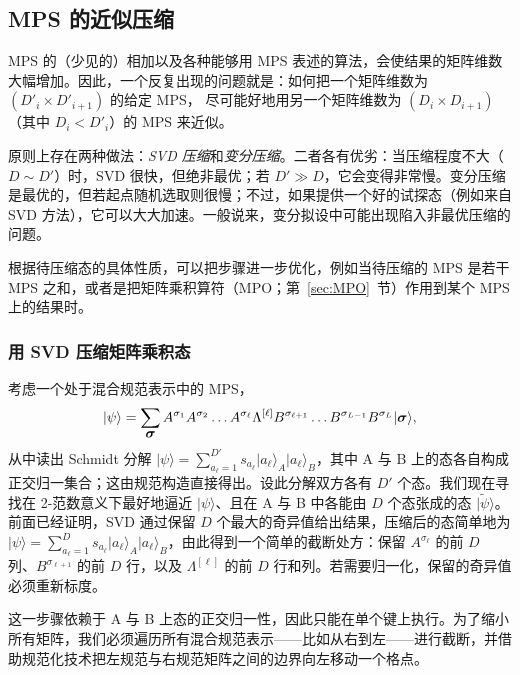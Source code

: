 \documentclass[a4paper,10pt,oneside,onecolumn,1p,times]{elsarticle}
\newcommand{\ket}[1]{\mbox{$| #1  \rangle$}}
\newcommand{\fat}[1]{\mbox{\boldmath$#1$\unboldmath}}	%
\begin{document}
    
\subsection{MPS 的近似压缩}

MPS 的（少见的）相加以及各种能够用 MPS 表述的算法，会使结果的矩阵维数大幅增加。因此，一个反复出现的问题就是：如何把一个矩阵维数为 $(D'_i \times D'_{i+1})$ 的给定 MPS，
尽可能好地用另一个矩阵维数为 $(D_i \times D_{i+1})$（其中 $D_i < D'_i$）的 MPS 来近似。

原则上存在两种做法：{\em SVD 压缩}和{\em 变分压缩}。二者各有优劣：当压缩程度不大（$D \sim D'$）时，SVD 很快，但绝非最优；若 $D' \gg D$，它会变得非常慢。变分压缩是最优的，但若起点随机选取则很慢；不过，如果提供一个好的试探态（例如来自 SVD 方法），它可以大大加速。一般说来，变分拟设中可能出现陷入非最优压缩的问题。
 
根据待压缩态的具体性质，可以把步骤进一步优化，例如当待压缩的 MPS 是若干 MPS 之和，或者是把矩阵乘积算符（MPO；第~\ref{sec:MPO}~节）作用到某个 MPS 上的结果时。

\subsubsection{用 SVD 压缩矩阵乘积态}
考虑一个处于混合规范表示中的 MPS，
\begin{equation}
\ket{\psi} = \sum_{\fat{\sigma}} A^{\sigma_1} A^{\sigma_2} \ldots A^{\sigma_{\ell}} \Lambda^{[\ell]} B^{\sigma_{\ell+1}} \ldots B^{\sigma_{L-1}} B^{\sigma_L}  \ket{\fat{\sigma}} ,
\label{eq:compressionstart}
\end{equation}
从中读出 Schmidt 分解 $\ket{\psi} = \sum_{a_\ell=1}^{D'} s_{a_\ell} \ket{a_\ell}_A \ket{a_\ell}_B$，其中 A 与 B 上的态各自构成正交归一集合；这由规范构造直接得出。设此分解双方各有 $D'$ 个态。我们现在寻找在 2-范数意义下最好地逼近 $\ket{\psi}$、且在 A 与 B 中各能由 $D$ 个态张成的态 $\ket{\tilde{\psi}}$。前面已经证明，SVD 通过保留 $D$ 个最大的奇异值给出结果，压缩后的态简单地为 $\ket{\psi} = \sum_{a_\ell=1}^{D} s_{a_\ell} \ket{a_\ell}_A \ket{a_\ell}_B$，由此得到一个简单的截断处方：保留 $A^{\sigma_{\ell}}$ 的前 $D$ 列、$B^{\sigma_{\ell+1}}$ 的前 $D$ 行，以及 $\Lambda^{[\ell]}$ 的前 $D$ 行和列。若需要归一化，保留的奇异值必须重新标度。

这一步骤依赖于 A 与 B 上态的正交归一性，因此只能在单个键上执行。为了缩小所有矩阵，我们必须遍历所有混合规范表示——比如从右到左——进行截断，并借助规范化技术把左规范与右规范矩阵之间的边界向左移动一个格点。
\end{document}
